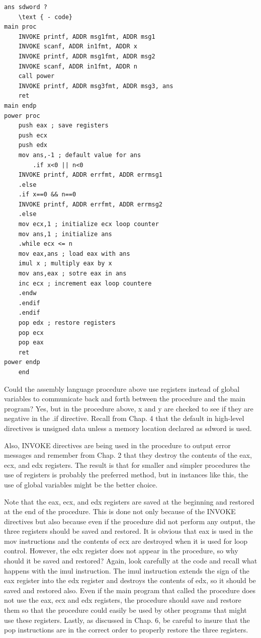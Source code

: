 \documentclass[10pt]{article}
\begin{document}
\begin{verbatim}
ans sdword ?
    \text { - code}
main proc
    INVOKE printf, ADDR msg1fmt, ADDR msg1
    INVOKE scanf, ADDR in1fmt, ADDR x
    INVOKE printf, ADDR msg1fmt, ADDR msg2
    INVOKE scanf, ADDR in1fmt, ADDR n
    call power
    INVOKE printf, ADDR msg3fmt, ADDR msg3, ans
    ret
main endp
power proc
    push eax ; save registers
    push ecx
    push edx
    mov ans,-1 ; default value for ans
        .if x<0 || n<0
    INVOKE printf, ADDR errfmt, ADDR errmsg1
    .else
    .if x==0 && n==0
    INVOKE printf, ADDR errfmt, ADDR errmsg2
    .else
    mov ecx,1 ; initialize ecx loop counter
    mov ans,1 ; initialize ans
    .while ecx <= n
    mov eax,ans ; load eax with ans
    imul x ; multiply eax by x
    mov ans,eax ; sotre eax in ans
    inc ecx ; increment eax loop countere
    .endw
    .endif
    .endif
    pop edx ; restore registers
    pop ecx
    pop eax
    ret
power endp
    end
\end{verbatim}

Could the assembly language procedure above use registers instead of global variables to communicate back and forth between the procedure and the main program? Yes, but in the procedure above, x and y are checked to see if they are negative in the .if directive. Recall from Chap. 4 that the default in high-level directives is unsigned data unless a memory location declared as sdword is used.

Also, INVOKE directives are being used in the procedure to output error messages and remember from Chap. 2 that they destroy the contents of the eax, ecx, and edx registers. The result is that for smaller and simpler procedures the use of registers is probably the preferred method, but in instances like this, the use of global variables might be the better choice.

Note that the eax, ecx, and edx registers are saved at the beginning and restored at the end of the procedure. This is done not only because of the INVOKE directives but also because even if the procedure did not perform any output, the three registers should be saved and restored. It is obvious that eax is used in the mov instructions and the contents of ecx are destroyed when it is used for loop control. However, the edx register does not appear in the procedure, so why should it be saved and restored? Again, look carefully at the code and recall what happens with the imul instruction. The imul instruction extends the sign of the eax register into the edx register and destroys the contents of edx, so it should be saved and restored also. Even if the main program that called the procedure does not use the eax, ecx and edx registers, the procedure should save and restore them so that the procedure could easily be used by other programs that might use these registers. Lastly, as discussed in Chap. 6, be careful to insure that the pop instructions are in the correct order to properly restore the three registers.
\end{document}
